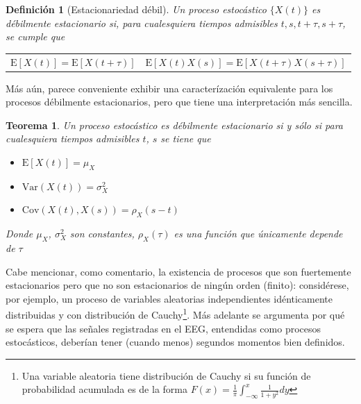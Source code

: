 \documentclass[12pt,a4paper]{mitthesis}
\newtheorem{defn}{Definici\'on}
\newtheorem{thrm}{Teorema}
\newcommand{\R}{\mathbb{R}}
\newcommand{\E}[1]{\mathrm{E}\left[ #1 \right]}
\newcommand{\Var}[1]{\mathrm{Var}\left( #1 \right)}
\newcommand{\Cov}[1]{\mathrm{Cov}\left( #1 \right)}
\begin{document}
\begin{defn}[Estacionariedad d\'ebil]
Un proceso estoc\'astico $\{ X(t) \}$ es d\'ebilmente estacionario si, para cualesquiera
tiempos admisibles $t, s, t+\tau, s+\tau$,
se cumple que
\begin{center}
\begin{tabular}{cc}
$\E{X(t)} = \E{X(t+\tau)}$
&
$\E{X(t)X(s)} = \E{X(t+\tau)X(s+\tau)}$
\end{tabular}
\end{center}
\label{est_orden_2}
\end{defn}

M\'as a\'un, parece conveniente exhibir una caracter\'izaci\'on equivalente para
los procesos d\'ebilmente estacionarios, pero que 
tiene una interpretaci\'on m\'as sencilla.
\begin{thrm}
Un proceso estoc\'astico 
es d\'ebilmente estacionario si y s\'olo si para cualesquiera tiempos admisibles $t$, 
$s$ se tiene que
\begin{itemize}
\item $\E{X(t)} = \mu_X$
\item $\Var{X(t)} = \sigma^{2}_X$
\item $\Cov{X(t),X(s)} = \rho_X (s-t)$
\end{itemize}
Donde $\mu_X$, $\sigma^{2}_X$ son constantes, $\rho_X(\tau)$ es una funci\'on que \'unicamente 
depende de $\tau$
\label{est_usual}
\end{thrm}

Cabe mencionar, como comentario, la existencia de procesos que son fuertemente 
estacionarios pero que no son estacionarios de ning\'un orden (finito): 
consid\'erese, por ejemplo,
un proceso de variables aleatorias independientes id\'enticamente 
distribuidas y con distribuci\'on de Cauchy\footnote{Una variable aleatoria tiene distribuci\'on
de Cauchy si su funci\'on de probabilidad acumulada es de la forma
$\displaystyle F(x) = \frac{1}{\pi} \int_{-\infty}^{x} \frac{1}{1+y^{2}} dy$}.
M\'as adelante se argumenta por qu\'e se espera que las se\~nales registradas en el
EEG, entendidas como procesos estoc\'asticos, deber\'ian 
tener (cuando menos) segundos momentos bien definidos.
\end{document}
